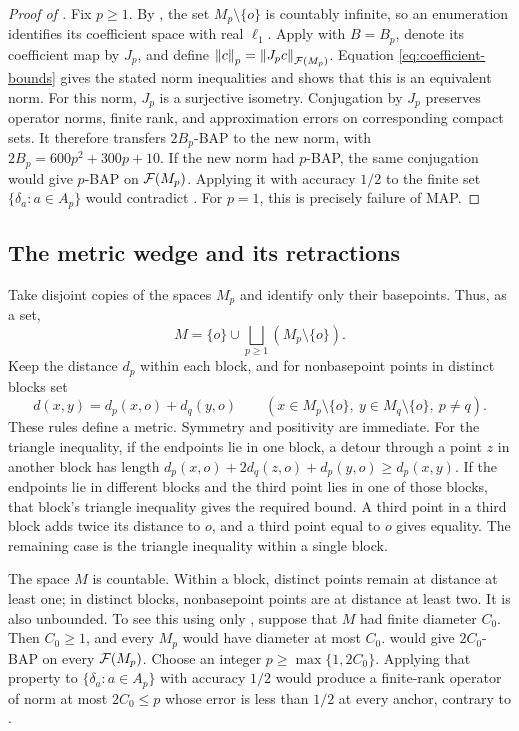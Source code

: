 \begin{proof}[Proof of ]
Fix $p\ge1$. By , the set $M_p\setminus\{o\}$ is
countably infinite, so an enumeration identifies its coefficient space
with real $\ell_1$. Apply  with $B=B_p$, denote
its coefficient map by $J_p$, and define
$\left\|c\right\|_p=\left\|J_pc\right\|_{\mathcal F(M_p)}$. Equation
\eqref{eq:coefficient-bounds} gives the stated norm inequalities and
shows that this is an equivalent norm. For this norm, $J_p$ is a
surjective isometry. Conjugation by $J_p$ preserves operator norms,
finite rank, and approximation errors on corresponding compact sets.
It therefore transfers $2B_p$-BAP to the new norm, with
$2B_p=600p^2+300p+10$. If the new norm had $p$-BAP, the same conjugation
would give $p$-BAP on $\mathcal F(M_p)$. Applying it with accuracy $1/2$ to
the finite set $\{\delta_a:a\in A_p\}$ would contradict
. For $p=1$, this is precisely failure of MAP.
\end{proof}

\subsection{The metric wedge and its retractions}

Take disjoint copies of the spaces $M_p$ and identify only their
basepoints. Thus, as a set,
\[
 M=\{o\}\cup\bigsqcup_{p\ge1}(M_p\setminus\{o\}).
\]
Keep the distance $d_p$ within each block, and for nonbasepoint points
in distinct blocks set
\begin{equation}\label{eq:wedge-metric}
 d(x,y)=d_p(x,o)+d_q(y,o)
 \qquad(x\in M_p\setminus\{o\},\ y\in M_q\setminus\{o\},\ p\ne q).
\end{equation}
These rules define a metric. Symmetry and positivity are immediate.
For the triangle inequality, if the endpoints lie in one block, a
detour through a point $z$ in another block has length
$d_p(x,o)+2d_q(z,o)+d_p(y,o)\ge d_p(x,y)$. If the endpoints lie in
different blocks and the third point lies in one of those blocks, that
block's triangle inequality gives the required bound. A third point in
a third block adds twice its distance to $o$, and a third point equal
to $o$ gives equality. The remaining case is the triangle inequality
within a single block.

The space $M$ is countable. Within a block, distinct points remain at
distance at least one; in distinct blocks, nonbasepoint points are at
distance at least two. It is also unbounded. To see this using only
, suppose that $M$ had finite diameter $C_0$. Then
$C_0\ge1$, and every $M_p$ would have diameter at most $C_0$.
 would give $2C_0$-BAP on every $\mathcal F(M_p)$.
Choose an integer $p\ge\max\{1,2C_0\}$. Applying that property to
$\{\delta_a:a\in A_p\}$ with accuracy $1/2$ would produce a finite-rank
operator of norm at most $2C_0\le p$ whose error is less than $1/2$
at every anchor, contrary to .

